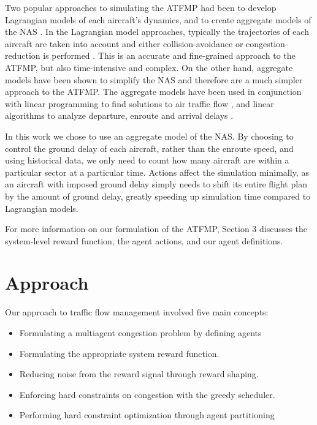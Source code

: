 \documentclass[onehalf,11pt]{beavtex}
\begin{document}
Two popular approaches to simulating the ATFMP had been to develop Lagrangian models of each aircraft's dynamics, and to create aggregate models of the NAS \cite{Bertsimas:1998:ATF:767667.768027, Bilimoria, McNally, Mueller_analysisof}. In the Lagrangian model approaches, typically the trajectories of each aircraft are taken into account and either collision-avoidance or congestion-reduction is performed \cite{Bilimoria, McNally}. This is an accurate and fine-grained approach to the ATFMP, but also time-intensive and complex. On the other hand, aggregate models have been shown to simplify the NAS and therefore are a much simpler approach to the ATFMP. The aggregate models have been used in conjunction with linear programming to find solutions to air traffic flow \cite{Bertsimas:1998:ATF:767667.768027}, and linear algorithms to analyze departure, enroute and arrival delays \cite{Mueller_analysisof}.

In this work we chose to use an aggregate model of the NAS. By choosing to control the ground delay of each aircraft, rather than the enroute speed, and using historical data, we only need to count how many aircraft are within a particular sector at a particular time. Actions affect the simulation minimally, as an aircraft with imposed ground delay simply needs to shift its entire flight plan by the amount of ground delay, greatly speeding up simulation time compared to Lagrangian models.

For more information on our formulation of the ATFMP, Section 3 discusses the system-level reward function, the agent actions, and our agent definitions. 

\chapter{Approach}

Our approach to traffic flow management involved five main concepts: 
\begin{itemize}
\item Formulating a multiagent congestion problem by defining agents
\item Formulating the appropriate system reward function.
\item Reducing noise from the reward signal through reward shaping.
\item Enforcing hard constraints on congestion with the greedy scheduler.
\item Performing hard constraint optimization through agent partitioning
\end{itemize}
\end{document}
